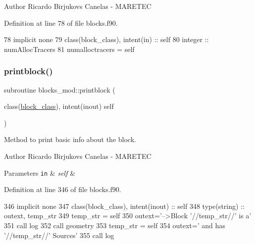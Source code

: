 \begin{DoxyAuthor}{Author}
Ricardo Birjukovs Canelas -\/ M\+A\+R\+E\+T\+EC 
\end{DoxyAuthor}


Definition at line 78 of file blocks.\+f90.


\begin{DoxyCode}
78     \textcolor{keywordtype}{implicit none}
79     \textcolor{keywordtype}{class}(block\_class), \textcolor{keywordtype}{intent(in)} :: self
80     \textcolor{keywordtype}{integer} :: numAllocTracers
81     numalloctracers = self%
\end{DoxyCode}
\mbox{\label{namespaceblocks__mod_a6eab8b323cb15dcecb5c6b0c31b4e246}} 
\subsubsection{\texorpdfstring{printblock()}{printblock()}}
{\footnotesize\ttfamily subroutine blocks\+\_\+mod\+::printblock (\begin{DoxyParamCaption}\item[{class(\mbox{\hyperlink{structblocks__mod_1_1block__class}{block\+\_\+class}}), intent(inout)}]{self }\end{DoxyParamCaption})\hspace{0.3cm}{\ttfamily [private]}}



Method to print basic info about the block. 

\begin{DoxyAuthor}{Author}
Ricardo Birjukovs Canelas -\/ M\+A\+R\+E\+T\+EC 
\end{DoxyAuthor}

\begin{DoxyParams}[1]{Parameters}
\mbox{\tt in}  & {\em self} & \\
\hline
\end{DoxyParams}


Definition at line 346 of file blocks.\+f90.


\begin{DoxyCode}
346     \textcolor{keywordtype}{implicit none}
347     \textcolor{keywordtype}{class}(block\_class), \textcolor{keywordtype}{intent(inout)} :: self
348     \textcolor{keywordtype}{type}(string) :: outext, temp\_str
349     temp\_str = self%
350     outext=\textcolor{stringliteral}{'-->Block '}//temp\_str//\textcolor{stringliteral}{' is a'}
351     \textcolor{keyword}{call }log%
352     \textcolor{keyword}{call }geometry%
353     temp\_str = self%
354     outext=\textcolor{stringliteral}{'      and has '}//temp\_str//\textcolor{stringliteral}{' Sources'}
355     \textcolor{keyword}{call }log%
\end{DoxyCode}
\mbox{\label{namespaceblocks__mod_a10f356706988c45a255922fe70851488}} 
